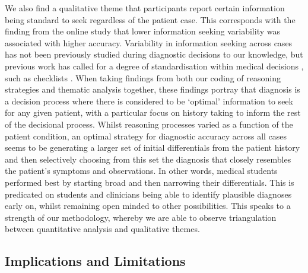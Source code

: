\documentclass[a4paper, nobind]{templates/ociamthesis}
\begin{document}
We also find a qualitative theme that participants report certain information being standard to seek regardless of the patient case. This corresponds with the finding from the online study that lower information seeking variability was associated with higher accuracy. Variability in information seeking across cases has not been previously studied during diagnostic decisions to our knowledge, but previous work has called for a degree of standardisation within medical decisions \autocite{wears_standardisation_2015}, such as checklists \autocite{ely_checklists_2011}. When taking findings from both our coding of reasoning strategies and thematic analysis together, these findings portray that diagnosis is a decision process where there is considered to be `optimal' information to seek for any given patient, with a particular focus on history taking to inform the rest of the decisional process. Whilst reasoning processes varied as a function of the patient condition, an optimal strategy for diagnostic accuracy across all cases seems to be generating a larger set of initial differentials from the patient history and then selectively choosing from this set the diagnosis that closely resembles the patient's symptoms and observations. In other words, medical students performed best by starting broad and then narrowing their differentials. This is predicated on students and clinicians being able to identify plausible diagnoses early on, whilst remaining open minded to other possibilities. This speaks to a strength of our methodology, whereby we are able to observe triangulation between quantitative analysis and qualitative themes.

\subsection*{Implications and Limitations}\label{implications-and-limitations}
\end{document}
